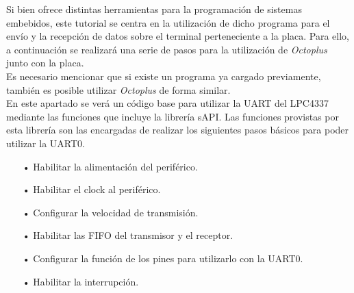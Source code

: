 \documentclass[12pt,letterpaper]{article}
\begin{document}
Si bien ofrece distintas herramientas para la programación de sistemas embebidos, este tutorial se centra en la utilización de dicho programa para el envío y la recepción de datos sobre el terminal perteneciente a la placa. Para ello, a continuación se realizará una serie de pasos para la utilización de \textit{Octoplus} junto con la placa.
 \\
 
Es necesario mencionar que si existe un programa ya cargado previamente, también es posible utilizar \textit{Octoplus} de forma similar.
 \\
 
En este apartado se verá un código base para utilizar la UART del LPC4337 mediante las funciones que incluye la librería sAPI. Las funciones provistas por esta librería son las encargadas de realizar los siguientes pasos básicos para poder utilizar la UART0.

\begin{enumerate}
\item[•]Habilitar la alimentación del periférico.
\item[•]Habilitar el clock al periférico.
\item[•]Configurar la velocidad de transmisión.
\item[•]Habilitar las FIFO del transmisor y el receptor.
\item[•]Configurar la función de los pines para utilizarlo con la UART0.
\item[•]Habilitar la interrupción.
\end{enumerate}
\end{document}
